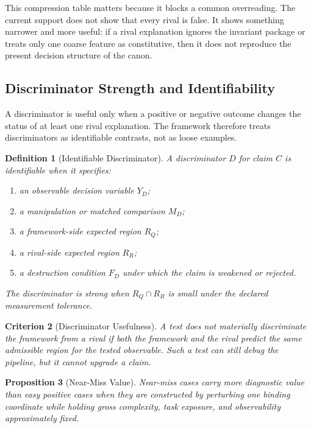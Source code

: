 \documentclass[11pt,a4paper]{article}
\newtheorem{proposition}{Proposition}[section]
\newtheorem{definition}[proposition]{Definition}
\newtheorem{criterion}[proposition]{Criterion}
\begin{document}
This compression table matters because it blocks a common overreading. The current support does not show that every rival is false. It shows something narrower and more useful: if a rival explanation ignores the invariant package or treats only one coarse feature as constitutive, then it does not reproduce the present decision structure of the canon.

\subsection{Discriminator Strength and Identifiability}
A discriminator is useful only when a positive or negative outcome changes the
status of at least one rival explanation. The framework therefore treats
discriminators as identifiable contrasts, not as loose examples.

\begin{definition}[Identifiable Discriminator]
A discriminator $D$ for claim $C$ is identifiable when it specifies:
\begin{enumerate}[leftmargin=1.5em]
\item an observable decision variable $Y_D$;
\item a manipulation or matched comparison $M_D$;
\item a framework-side expected region $R_Q$;
\item a rival-side expected region $R_R$;
\item a destruction condition $F_D$ under which the claim is weakened or rejected.
\end{enumerate}
The discriminator is strong when $R_Q\cap R_R$ is small under the declared
measurement tolerance.
\end{definition}

\begin{criterion}[Discriminator Usefulness]
A test does not materially discriminate the framework from a rival if both the
framework and the rival predict the same admissible region for the tested
observable. Such a test can still debug the pipeline, but it cannot upgrade a
claim.
\end{criterion}

\begin{proposition}[Near-Miss Value]
Near-miss cases carry more diagnostic value than easy positive cases when they
are constructed by perturbing one binding coordinate while holding gross
complexity, task exposure, and observability approximately fixed.
\end{proposition}
\end{document}
